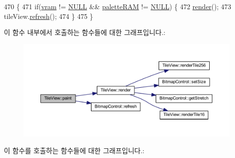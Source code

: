 \begin{DoxyCode}
470 \{
471   \textcolor{keywordflow}{if}(\mbox{\hyperlink{_globals_8cpp_a983f8cd19ae66ea98e180c2e13bee5b9}{vram}} != \mbox{\hyperlink{getopt1_8c_a070d2ce7b6bb7e5c05602aa8c308d0c4}{NULL}} && \mbox{\hyperlink{_globals_8cpp_aea0283719ad27328f3cf5f883f58813e}{paletteRAM}} != \mbox{\hyperlink{getopt1_8c_a070d2ce7b6bb7e5c05602aa8c308d0c4}{NULL}}) \{
472     \mbox{\hyperlink{class_tile_view_a4b8f6e14f8ee7d4abea3a751cb5f7d74}{render}}();
473     tileView.\mbox{\hyperlink{class_bitmap_control_acf061a1e9a4cad90ad2827c14f79caa2}{refresh}}();
474   \}
475 \}
\end{DoxyCode}
이 함수 내부에서 호출하는 함수들에 대한 그래프입니다.\+:
\nopagebreak
\begin{figure}[H]
\begin{center}
\leavevmode
\includegraphics[width=350pt]{class_tile_view_a4341071a0cab0d5a8b6dfa7318230636_cgraph}
\end{center}
\end{figure}
이 함수를 호출하는 함수들에 대한 그래프입니다.\+:
\nopagebreak
